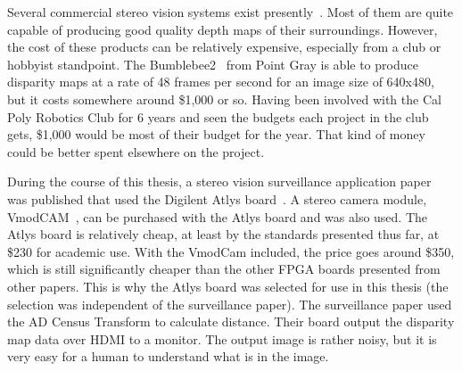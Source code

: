 Several commercial stereo vision systems exist presently~\cite{similarAlgorithms}. Most of them are quite capable of producing good quality depth maps of their surroundings. However, the cost of these products can be relatively expensive, especially from a club or hobbyist standpoint. The Bumblebee2~\cite{bumblebee} from Point Gray is able to produce disparity maps at a rate of 48 frames per second for an image size of 640x480, but it costs somewhere around \$1,000 or so. Having been involved with the Cal Poly Robotics Club for 6 years and seen the budgets each project in the club gets, \$1,000 would be most of their budget for the year. That kind of money could be better spent elsewhere on the project.

During the course of this thesis, a stereo vision surveillance application paper~\cite{surveillance} was published that used the Digilent Atlys board~\cite{atlysBoard}. A stereo camera module, VmodCAM~\cite{vmodcam}, can be purchased with the Atlys board and was also used. The Atlys board is relatively cheap, at least by the standards presented thus far, at \$230 for academic use. With the VmodCam included, the price goes around \$350, which is still significantly cheaper than the other FPGA boards presented from other papers. This is why the Atlys board was selected for use in this thesis (the selection was independent of the surveillance paper). The surveillance paper used the AD Census Transform to calculate distance. Their board output the disparity map data over HDMI to a monitor. The output image is rather noisy, but it is very easy for a human to understand what is in the image.